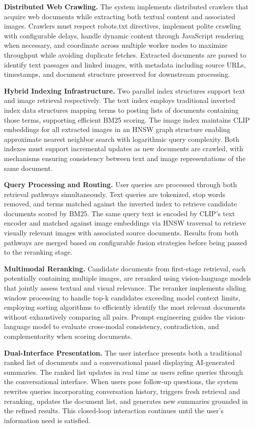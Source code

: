 \textbf{Distributed Web Crawling.} The system implements distributed crawlers that acquire web documents while extracting both textual content and associated images. Crawlers must respect robots.txt directives, implement polite crawling with configurable delays, handle dynamic content through JavaScript rendering when necessary, and coordinate across multiple worker nodes to maximize throughput while avoiding duplicate fetches. Extracted documents are parsed to identify text passages and linked images, with metadata including source URLs, timestamps, and document structure preserved for downstream processing.

\textbf{Hybrid Indexing Infrastructure.} Two parallel index structures support text and image retrieval respectively. The text index employs traditional inverted index data structures mapping terms to posting lists of documents containing those terms, supporting efficient BM25 scoring. The image index maintains CLIP embeddings for all extracted images in an HNSW graph structure enabling approximate nearest neighbor search with logarithmic query complexity. Both indexes must support incremental updates as new documents are crawled, with mechanisms ensuring consistency between text and image representations of the same document.

\textbf{Query Processing and Routing.} User queries are processed through both retrieval pathways simultaneously. Text queries are tokenized, stop words removed, and terms matched against the inverted index to retrieve candidate documents scored by BM25. The same query text is encoded by CLIP's text encoder and matched against image embeddings via HNSW traversal to retrieve visually relevant images with associated source documents. Results from both pathways are merged based on configurable fusion strategies before being passed to the reranking stage.

\textbf{Multimodal Reranking.} Candidate documents from first-stage retrieval, each potentially containing multiple images, are reranked using vision-language models that jointly assess textual and visual relevance. The reranker implements sliding window processing to handle top-k candidates exceeding model context limits, employing sorting algorithms to efficiently identify the most relevant documents without exhaustively comparing all pairs. Prompt engineering guides the vision-language model to evaluate cross-modal consistency, contradiction, and complementarity when scoring documents.

\textbf{Dual-Interface Presentation.} The user interface presents both a traditional ranked list of documents and a conversational panel displaying AI-generated summaries. The ranked list updates in real time as users refine queries through the conversational interface. When users pose follow-up questions, the system rewrites queries incorporating conversation history, triggers fresh retrieval and reranking, updates the document list, and generates new summaries grounded in the refined results. This closed-loop interaction continues until the user's information need is satisfied.

